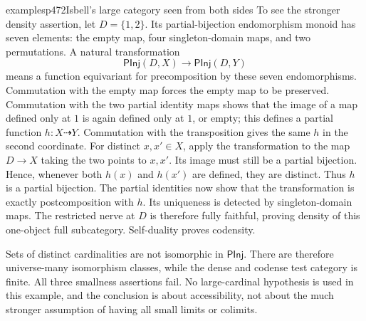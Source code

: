 \begin{dcomment}{examples}{p472}{Isbell's large category seen from both sides}
To see the stronger density assertion, let $D=\{1,2\}$. Its partial-bijection endomorphism monoid has seven elements: the empty map, four singleton-domain maps, and two permutations. A natural transformation
\[
 \mathsf{PInj}(D,X)\longrightarrow\mathsf{PInj}(D,Y)
\]
means a function equivariant for precomposition by these seven endomorphisms. Commutation with the empty map forces the empty map to be preserved. Commutation with the two partial identity maps shows that the image of a map defined only at $1$ is again defined only at $1$, or empty; this defines a partial function $h:X\dashrightarrow Y$. Commutation with the transposition gives the same $h$ in the second coordinate. For distinct $x,x'\in X$, apply the transformation to the map $D\to X$ taking the two points to $x,x'$. Its image must still be a partial bijection. Hence, whenever both $h(x)$ and $h(x')$ are defined, they are distinct. Thus $h$ is a partial bijection. The partial identities now show that the transformation is exactly postcomposition with $h$. Its uniqueness is detected by singleton-domain maps. The restricted nerve at $D$ is therefore fully faithful, proving density of this one-object full subcategory. Self-duality proves codensity.

Sets of distinct cardinalities are not isomorphic in $\mathsf{PInj}$. There are therefore universe-many isomorphism classes, while the dense and codense test category is finite. All three smallness assertions fail. No large-cardinal hypothesis is used in this example, and the conclusion is about accessibility, not about the much stronger assumption of having all small limits or colimits.
\end{dcomment}

